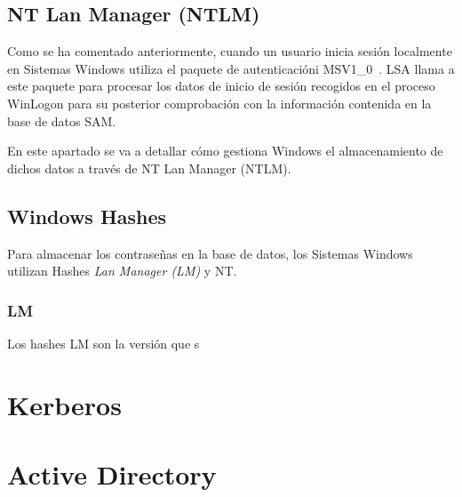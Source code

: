\subsection{NT Lan Manager (NTLM)}



Como se ha comentado anteriormente, cuando un usuario inicia sesión localmente en Sistemas Windows utiliza el paquete de autenticacióni MSV1\_0~\cite{Capitulo2:MSV10}. LSA llama a este paquete para procesar los datos de inicio de sesión recogidos en el proceso WinLogon para su posterior comprobación con la información contenida en la base de datos SAM. 


En este apartado se va a detallar cómo gestiona Windows el almacenamiento de dichos datos a través de NT Lan Manager (NTLM). \\

\subsection{Windows Hashes}

Para almacenar los contraseñas en la base de datos, los Sistemas Windows utilizan Hashes {\it Lan Manager (LM)} y NT.

\subsubsection{LM}

Los hashes LM son la versión que s


\section{Kerberos}

\section{Active Directory}




